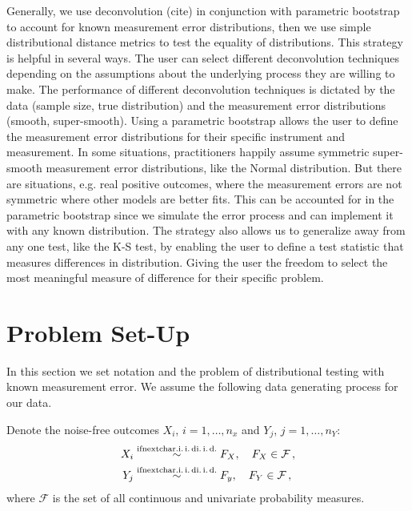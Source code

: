 \documentclass[12pt]{article}
\makeatletter
\newcommand*{\iid}{%
    \@ifnextchar{.}%
        {i.\,i.\,d}%
        {i.\,i.\,d.\@}%
}
\newcommand{\mathiid}{\text{\iid}}
\newcommand{\simiid}{\overset{\mathiid}{\sim}}
\newcommand{\alldistribs}{\mathcal{F}}
\makeatother
\begin{document}
Generally, we use deconvolution (cite) in conjunction with parametric bootstrap to account for known measurement error distributions, then we use simple distributional distance metrics to test the equality of distributions. This strategy is helpful in several ways. The user can select different deconvolution techniques depending on the assumptions about the underlying process they are willing to make. The performance of different deconvolution techniques is dictated by the data (sample size, true distribution) and the measurement error distributions (smooth, super-smooth). Using a parametric bootstrap allows the user to define the measurement error distributions for their specific instrument and measurement. In some situations, practitioners happily assume symmetric super-smooth measurement error distributions, like the Normal distribution. But there are situations, e.g. real positive outcomes, where the measurement errors are not symmetric where other models are better fits. This can be accounted for in the parametric bootstrap since we simulate the error process and can implement it with any known distribution. The strategy also allows us to generalize away from any one test, like the K-S test, by enabling the user to define a test statistic that measures differences in distribution. Giving the user the freedom to select the most meaningful measure of difference for their specific problem. 


\section{Problem Set-Up} %
\label{sec:problem_set_up}

In this section we set notation and the problem of distributional testing with known measurement error. 
We assume the following data generating process for our data. 

Denote the noise-free outcomes $X_i$, $i = 1,\dotsc,n_x$ and $Y_j$, $j=1,\dotsc,n_Y$:
\begin{equation}
\begin{split}
    X_i &\simiid F_X,\quad F_X \in \alldistribs \,, \\
    Y_j &\simiid F_y,\quad F_Y \in \alldistribs \,,
\end{split}
\end{equation}
where $\alldistribs$ is the set of all continuous and univariate probability measures.
\end{document}
